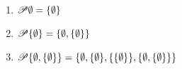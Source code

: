 \begin{example}
  \begin{enumerate}[1)]
  \item
    $\mathscr{P}\emptyset = \{\emptyset\}$
  \item
    $\mathscr{P}\{\emptyset\} = \{\emptyset,\{\emptyset\}\}$
  \item
    $\mathscr{P}\{\emptyset,\{\emptyset\}\} = \{\emptyset,\{\emptyset\},\{\{\emptyset\}\}, \{\emptyset,\{\emptyset\}\}\}$
  \end{enumerate}
\end{example}






